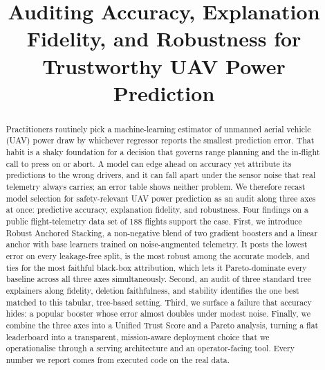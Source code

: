 \documentclass[conference]{IEEEtran}
\begin{document}
\title{Auditing Accuracy, Explanation Fidelity, and Robustness for Trustworthy UAV Power Prediction}

\author{%
}


\maketitle

\begin{abstract}
Practitioners routinely pick a machine-learning estimator of unmanned aerial vehicle (UAV) power draw by whichever regressor reports the smallest prediction error. That habit is a shaky foundation for a decision that governs range planning and the in-flight call to press on or abort. A model can edge ahead on accuracy yet attribute its predictions to the wrong drivers, and it can fall apart under the sensor noise that real telemetry always carries; an error table shows neither problem. We therefore recast model selection for safety-relevant UAV power prediction as an audit along three axes at once: predictive accuracy, explanation fidelity, and robustness. Four findings on a public flight-telemetry data set of 188 flights support the case. First, we introduce Robust Anchored Stacking, a non-negative blend of two gradient boosters and a linear anchor with base learners trained on noise-augmented telemetry. It posts the lowest error on every leakage-free split, is the most robust among the accurate models, and ties for the most faithful black-box attribution, which lets it Pareto-dominate every baseline across all three axes simultaneously. Second, an audit of three standard tree explainers along fidelity, deletion faithfulness, and stability identifies the one best matched to this tabular, tree-based setting. Third, we surface a failure that accuracy hides: a popular booster whose error almost doubles under modest noise. Finally, we combine the three axes into a Unified Trust Score and a Pareto analysis, turning a flat leaderboard into a transparent, mission-aware deployment choice that we operationalise through a serving architecture and an operator-facing tool. Every number we report comes from executed code on the real data.
\end{abstract}
\end{document}
